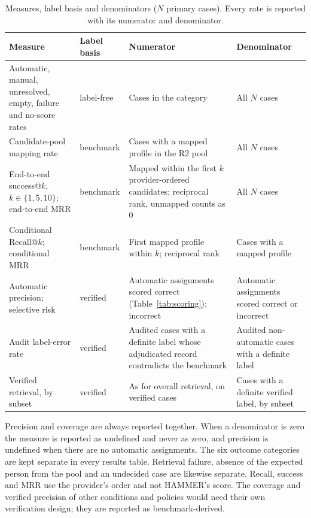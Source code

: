 \begin{table}[t]
\caption{Measures, label basis and denominators ($N$ primary cases). Every rate is reported with its numerator and denominator.}
\label{tab:metrics}
\centering
\footnotesize
\renewcommand{\arraystretch}{1.12}
\begin{tabular}{@{}p{}p{}p{}p{}@{}}
\toprule
\textbf{Measure} & \textbf{Label basis} & \textbf{Numerator} & \textbf{Denominator} \\
\midrule
Automatic, manual, unresolved, empty, failure and no-score rates & label-free & Cases in the category & All $N$ cases \\
Candidate-pool mapping rate & benchmark & Cases with a mapped profile in the R2 pool & All $N$ cases \\
End-to-end success@$k$, $k\in\{1,5,10\}$; end-to-end MRR & benchmark & Mapped within the first $k$ provider-ordered candidates; reciprocal rank, unmapped counts as 0 & All $N$ cases \\
Conditional Recall@$k$; conditional MRR & benchmark & First mapped profile within $k$; reciprocal rank & Cases with a mapped profile \\
Automatic precision; selective risk & verified & Automatic assignments scored correct (Table~\ref{tab:scoring}); incorrect & Automatic assignments scored correct or incorrect \\
Audit label-error rate & verified & Audited cases with a definite label whose adjudicated record contradicts the benchmark & Audited non-automatic cases with a definite label \\
Verified retrieval, by subset & verified & As for overall retrieval, on verified cases & Cases with a definite verified label, by subset \\
\bottomrule
\end{tabular}
\end{table}

Precision and coverage are always reported together. When a denominator is zero the measure is reported as undefined and never as zero, and precision is undefined when there are no automatic assignments. The six outcome categories are kept separate in every results table. Retrieval failure, absence of the expected person from the pool and an undecided case are likewise separate. Recall, success and MRR use the provider's order and not HAMMER's score. The coverage and verified precision of other conditions and policies would need their own verification design; they are reported as benchmark-derived.

